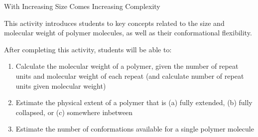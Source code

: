 %
%
%
%

\renewcommand{\figpath}{content/intro/size-and-complexity/figs}
\renewcommand{\labelbase}{size-and-complexity}

\begin{activity}{With Increasing Size Comes Increasing Complexity}
\label{\labelbase}

\begin{instructornotes}

	This activity introduces students to key concepts related to the size and molecular weight of polymer molecules, as well as their conformational flexibility.
	
	After completing this activity, students will be able to:
			\begin{enumerate}
				\item Calculate the molecular weight of a polymer, given the number of repeat units and molecular weight of each repeat (and calculate number of repeat units given molecular weight)
				\item Estimate the physical extent of a polymer that is (a) fully extended, (b) fully collapsed, or (c) somewhere inbetween
				\item Estimate the number of conformations available for a single polymer molecule
			\end{enumerate}
			

\end{instructornotes}
\end{activity}
